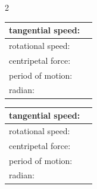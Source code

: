 \documentclass[12pt,landscape]{article}
\begin{document}
\pagestyle{empty}

\newcommand{\mycontent}{
  \def\myend{\\[8em]\hline}

  \begin{tabular}{l|p{3in}}
    \hline
    tangential speed: & \myend
    rotational speed: & \myend
    centripetal force:   & \myend \hline
    period of motion:    & \myend
    radian:              & \myend
  \end{tabular}
}

\begin{multicols*}{2}

  \mycontent

  \columnbreak

  \mycontent

\end{multicols*}
\end{document}
